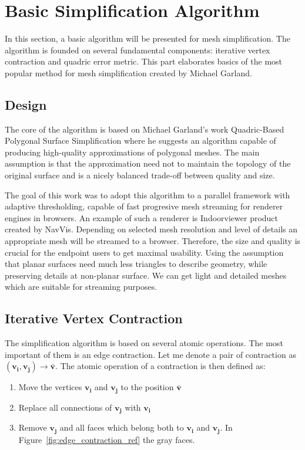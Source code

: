 \chapter{Basic Simplification Algorithm}
\thispagestyle{empty}%
In this section, a basic algorithm will be presented for mesh simplification. The algorithm is founded on several fundamental components: iterative vertex contraction and quadric error metric. This part elaborates basics of the most popular method for mesh simplification created by Michael Garland.
\section{Design}
The core of the algorithm is based on Michael Garland's work Quadric-Based Polygonal Surface Simplification \cite{garland99} where he suggests an algorithm capable of producing high-quality approximations of polygonal meshes. The main assumption is that the approximation need not to maintain the topology of the original surface and is a nicely balanced trade-off between quality and size.

The goal of this work was to adopt this algorithm to a parallel framework with adaptive thresholding, capable of fast progresive mesh streaming \cite{yang01} for renderer engines in browsers. An example of such a renderer is Indoorviewer product created by NavVis. Depending on selected mesh resolution and level of details an appropriate mesh will be streamed to a browser. Therefore, the size and quality is crucial for the endpoint users to get maximal usability. Using the assumption that planar surfaces need much less triangles to describe geometry, while preserving details at non-planar surface. We can get light and detailed meshes which are suitable for streaming purposes.
\clearpage

\section{Iterative Vertex Contraction}
The simplification algorithm is based on several atomic operations. The most important of them is an edge contraction. Let me denote a pair of contraction as $(\mathbf{v_i}, \mathbf{v_j})\rightarrow\bar{\mathbf{v}}$. The atomic operation of a contraction is then defined as:

\begin{enumerate}
\item Move the vertices $\mathbf{v_i}$ and $\mathbf{v_j}$ to the position $\bar{\mathbf{v}}$
\item Replace all connections of $\mathbf{v_j}$ with $\mathbf{v_i}$
\item Remove $\mathbf{v_j}$ and all faces which belong both to $\mathbf{v_i}$ and $\mathbf{v_j}$. In Figure~\ref{fig:edge_contraction_ref} the gray faces.
\end{enumerate}

